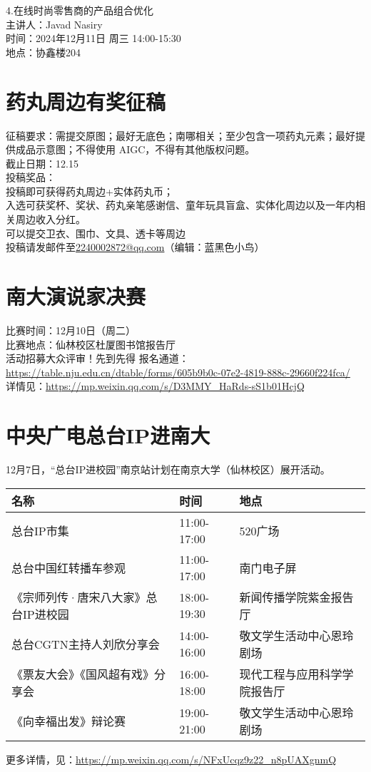\documentclass[letterpaper, 12pt]{article}
\begin{document}
\begin{multicols}{2}
4.在线时尚零售商的产品组合优化\\
主讲人：Javad Nasiry\\
时间：2024年12月11日 周三 14:00-15:30\\
地点：协鑫楼204\\

\section{药丸周边有奖征稿}
征稿要求：需提交原图；最好无底色；南哪相关；至少包含一项药丸元素；最好提供成品示意图；不得使用 AIGC，不得有其他版权问题。\\
截止日期：12.15\\
投稿奖品：\\
投稿即可获得药丸周边+实体药丸币；\\
入选可获奖杯、奖状、药丸亲笔感谢信、童年玩具盲盒、实体化周边以及一年内相关周边收入分红。\\
可以提交卫衣、围巾、文具、透卡等周边\\
投稿请发邮件至\href{mailto:2240002872@qq.com}{2240002872@qq.com}（编辑：蓝黑色小鸟）

\section{南大演说家决赛}
比赛时间：12月10日（周二）\\
比赛地点：仙林校区杜厦图书馆报告厅\\
活动招募大众评审！先到先得 报名通道：\url{https://table.nju.edu.cn/dtable/forms/605b9b0c-07e2-4819-888c-29660f224fca/}\\
详情见：\url{https://mp.weixin.qq.com/s/D3MMY_HaRds-sS1b01HcjQ}\\

\section{中央广电总台IP进南大}
12月7日，“总台IP进校园”南京站计划在南京大学（仙林校区）展开活动。
\begin{tabularx}{0.5\textwidth}{|X|X|X|}
    \hline
    名称 & 时间 & 地点\\
    \hline\hline
    总台IP市集&11:00-17:00 & 520广场 \\\hline
   总台中国红转播车参观&11:00-17:00&南门电子屏\\\hline
《宗师列传·唐宋八大家》总台IP进校园&18:00-19:30&新闻传播学院紫金报告厅\\\hline
总台CGTN主持人刘欣分享会&14:00-16:00&敬文学生活动中心恩玲剧场\\\hline
《票友大会》《国风超有戏》分享会&16:00-18:00&现代工程与应用科学学院报告厅\\\hline
《向幸福出发》辩论赛&19:00-21:00&敬文学生活动中心恩玲剧场\\
    \hline
\end{tabularx}
更多详情，见：\url{https://mp.weixin.qq.com/s/NFxUcqz9z22_n8pUAXgnmQ}\\


\end{multicols}
\end{document}
